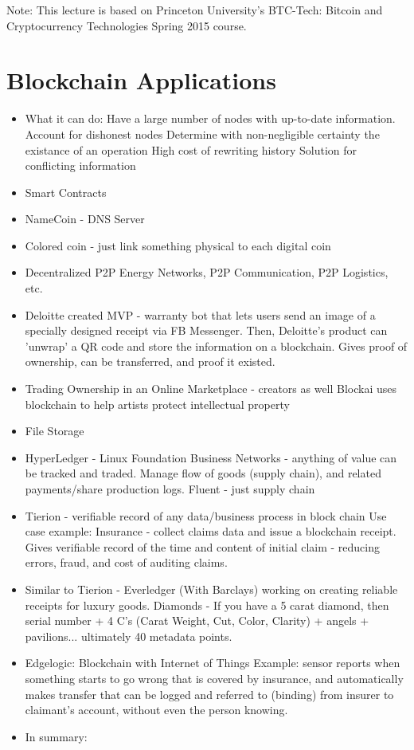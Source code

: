 \documentclass{article}
\begin{document}
\maketitle

Note: This lecture is based on Princeton University's BTC-Tech: Bitcoin and Cryptocurrency Technologies Spring 2015 course.


\section*{Blockchain Applications}
\begin{itemize}
  \item What it can do:
    \subitem Have a large number of nodes with up-to-date information.
    \subitem Account for dishonest nodes
    \subitem Determine with non-negligible certainty the existance of an operation
    \subitem High cost of rewriting history
    \subitem Solution for conflicting information
  \item Smart Contracts
  \item NameCoin - DNS Server
  \item Colored coin - just link something physical to each digital coin
  \item Decentralized P2P Energy Networks, P2P Communication, P2P Logistics, etc.
  \item Deloitte created MVP - warranty bot that lets users send an image of a specially designed receipt via FB Messenger.
    \subitem Then, Deloitte's product can 'unwrap' a QR code and store the information on a blockchain.
    \subitem Gives proof of ownership, can be transferred, and proof it existed.
  \item Trading Ownership in an Online Marketplace - creators as well
    \subitem Blockai uses blockchain to help artists protect intellectual property
  \item File Storage
  \item HyperLedger - Linux Foundation
    \subitem Business Networks - anything of value can be tracked and traded.
    \subitem Manage flow of goods (supply chain), and related payments/share production logs.
    \subitem Fluent - just supply chain
  \item Tierion - verifiable record of any data/business process in block chain
    \subitem Use case example: Insurance - collect claims data and issue a blockchain receipt. Gives verifiable
    record of the time and content of initial claim - reducing errors, fraud, and cost of auditing claims.
  \item Similar to Tierion - Everledger (With Barclays) working on creating reliable receipts for luxury goods.
    \subitem Diamonds - If you have a 5 carat diamond, then serial number + 4 C's (Carat Weight, Cut, Color, Clarity) +
    angels + pavilions... ultimately 40 metadata points.
  \item Edgelogic: Blockchain with Internet of Things
    \subitem Example: sensor reports when something starts to go wrong that is covered by insurance, and automatically makes transfer
    that can be logged and referred to (binding) from insurer to claimant's account, without even the person knowing. 
  \item In summary:
\end{itemize}
\end{document}
